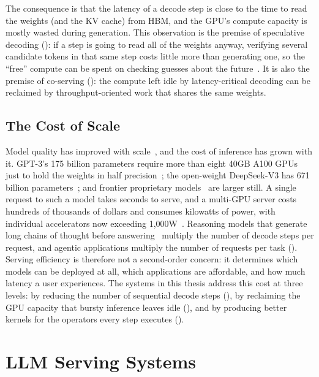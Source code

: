 The consequence is that the latency of a decode step is close to the time to read the weights (and the KV cache) from HBM, and the GPU's compute capacity is mostly wasted during generation.
This observation is the premise of speculative decoding (): if a step is going to read all of the weights anyway, verifying several candidate tokens in that same step costs little more than generating one, so the ``free'' compute can be spent on checking guesses about the future~\cite{leviathan2022fast,chen2023accelerating,specinfer}.
It is also the premise of co-serving (): the compute left idle by latency-critical decoding can be reclaimed by throughput-oriented work that shares the same weights.

\subsection{The Cost of Scale}
\label{background:subsec:cost}

Model quality has improved with scale~\cite{kaplan2020scaling,brown2020language,chowdhery2022palm}, and the cost of inference has grown with it.
GPT-3's 175 billion parameters require more than eight 40GB A100 GPUs just to hold the weights in half precision~\cite{brown2020language,zhang2022opt}; the open-weight DeepSeek-V3 has 671 billion parameters~\cite{deepseekai2024deepseekv3}; and frontier proprietary models~\cite{openai2023gpt4,gpt5} are larger still.
A single request to such a model takes seconds to serve, and a multi-GPU server costs hundreds of thousands of dollars and consumes kilowatts of power, with individual accelerators now exceeding 1,000W~\cite{lithos2025}.
Reasoning models that generate long chains of thought before answering~\cite{o1-preview,guo2025deepseek} multiply the number of decode steps per request, and agentic applications multiply the number of requests per task ().
Serving efficiency is therefore not a second-order concern: it determines which models can be deployed at all, which applications are affordable, and how much latency a user experiences.
The systems in this thesis address this cost at three levels: by reducing the number of sequential decode steps (), by reclaiming the GPU capacity that bursty inference leaves idle (), and by producing better kernels for the operators every step executes ().

\section{LLM Serving Systems}
\label{background:sec:serving}

